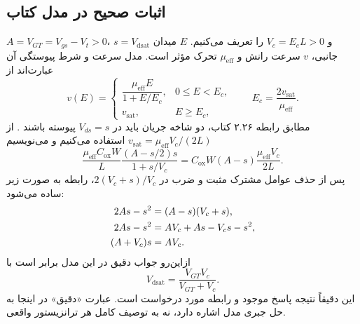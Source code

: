 \documentclass[12pt,a4paper]{article}
\newcommand{\exnum}[1]{\mbox{\beginL#1\endL}}
\begin{document}
\subsection*{اثبات صحیح در مدل کتاب}
\(A=V_{GT}=V_{gs}-V_t>0\)، \(s=V_{\mathrm{dsat}}\) و \(V_c=E_cL>0\) را تعریف می‌کنیم. \(E\) میدان جانبی، \(v\) سرعت رانش و \(\mu_{\mathrm{eff}}\) تحرک مؤثر است. مدل سرعت و شرط پیوستگی آن عبارت‌اند از
\begin{equation}
 v(E)=
 \begin{cases}
 \dfrac{\mu_{\mathrm{eff}}E}{1+E/E_c},&0\le E<E_c,\\[4pt]
 v_{\mathrm{sat}},&E\ge E_c,
 \end{cases}
 \qquad E_c=\frac{2v_{\mathrm{sat}}}{\mu_{\mathrm{eff}}}.
 \label{eq:velocity}
\end{equation}
مطابق رابطه \exnum{۲.۲۶} کتاب، دو شاخه جریان باید در \(V_{ds}=s\) پیوسته باشند \cite[صفحه چاپی ۷۷، صفحه ۱۰۴ فایل]{weste}. از \(v_{\mathrm{sat}}=\mu_{\mathrm{eff}}V_c/(2L)\) استفاده می‌کنیم و می‌نویسیم
\begin{equation}
 \frac{\mu_{\mathrm{eff}}C_{\mathrm{ox}}W}{L}
 \frac{(A-s/2)s}{1+s/V_c}
 =C_{\mathrm{ox}}W(A-s)\frac{\mu_{\mathrm{eff}}V_c}{2L}.
 \label{eq:velocity-match}
\end{equation}
پس از حذف عوامل مشترک مثبت و ضرب در \(2(V_c+s)/V_c\)، رابطه به صورت زیر ساده می‌شود:
\begin{align}
 2As-s^2&=(A-s)(V_c+s),\notag\\
 2As-s^2&=AV_c+As-V_cs-s^2,\notag\\
 (A+V_c)s&=AV_c.
 \label{eq:velocity-algebra}
\end{align}
ازاین‌رو جواب دقیق در این مدل برابر است با
\begin{equation}
 \boxed{V_{\mathrm{dsat}}=\frac{V_{GT}V_c}{V_{GT}+V_c}.}
 \label{eq:vdsat}
\end{equation}
این دقیقاً نتیجه پاسخ موجود و رابطه مورد درخواست است. عبارت «دقیق» در اینجا به حل جبری مدل اشاره دارد، نه به توصیف کامل هر ترانزیستور واقعی.
\end{document}
